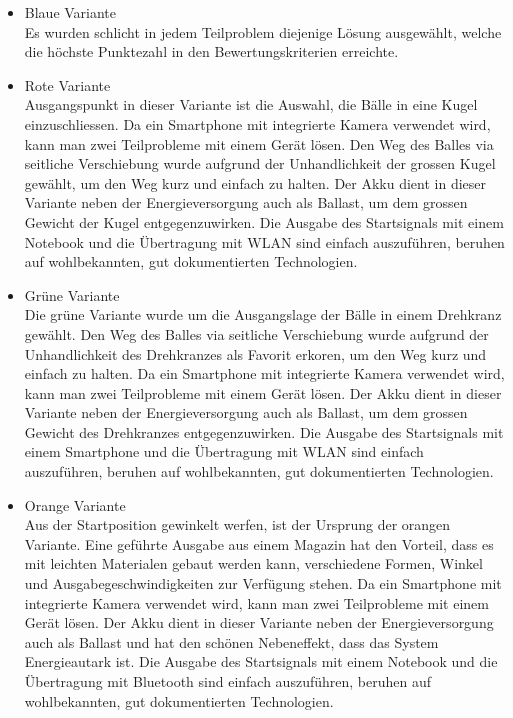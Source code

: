 \begin{itemize}
	\item Blaue Variante\\
	Es wurden schlicht in jedem Teilproblem diejenige Lösung ausgewählt, welche die höchste Punktezahl in den Bewertungskriterien erreichte.
	
	\item Rote Variante\\
	Ausgangspunkt in dieser Variante ist die Auswahl, die Bälle in eine Kugel einzuschliessen. Da ein Smartphone mit integrierte Kamera verwendet wird, kann man zwei Teilprobleme mit einem Gerät lösen. Den Weg des Balles via seitliche Verschiebung wurde aufgrund der Unhandlichkeit der grossen Kugel gewählt, um den Weg kurz und einfach zu halten. Der Akku dient in dieser Variante neben der Energieversorgung auch als Ballast, um dem grossen Gewicht der Kugel entgegenzuwirken. Die Ausgabe des Startsignals mit einem Notebook und die Übertragung mit WLAN sind einfach auszuführen, beruhen auf wohlbekannten, gut dokumentierten Technologien.
	
	\item Grüne Variante\\
	Die grüne Variante wurde um die Ausgangslage der Bälle in einem Drehkranz gewählt. Den Weg des Balles via seitliche Verschiebung wurde aufgrund der Unhandlichkeit des Drehkranzes als Favorit erkoren, um den Weg kurz und einfach zu halten. Da ein Smartphone mit integrierte Kamera verwendet wird, kann man zwei Teilprobleme mit einem Gerät lösen. Der Akku dient in dieser Variante neben der Energieversorgung auch als Ballast, um dem grossen Gewicht des Drehkranzes entgegenzuwirken. Die Ausgabe des Startsignals mit einem Smartphone und die Übertragung mit WLAN sind einfach auszuführen, beruhen auf wohlbekannten, gut dokumentierten Technologien.
	
	\item Orange Variante\\
	Aus der Startposition gewinkelt werfen, ist der Ursprung der orangen Variante. Eine geführte Ausgabe aus einem Magazin hat den Vorteil, dass es mit leichten Materialen gebaut werden kann, verschiedene Formen, Winkel und Ausgabegeschwindigkeiten zur Verfügung stehen. Da ein Smartphone mit integrierte Kamera verwendet wird, kann man zwei Teilprobleme mit einem Gerät lösen. Der Akku dient in dieser Variante neben der Energieversorgung auch als Ballast und hat den schönen Nebeneffekt, dass das System Energieautark ist. Die Ausgabe des Startsignals mit einem Notebook und die Übertragung mit Bluetooth sind einfach auszuführen, beruhen auf wohlbekannten, gut dokumentierten Technologien.
	
	
\end{itemize}

